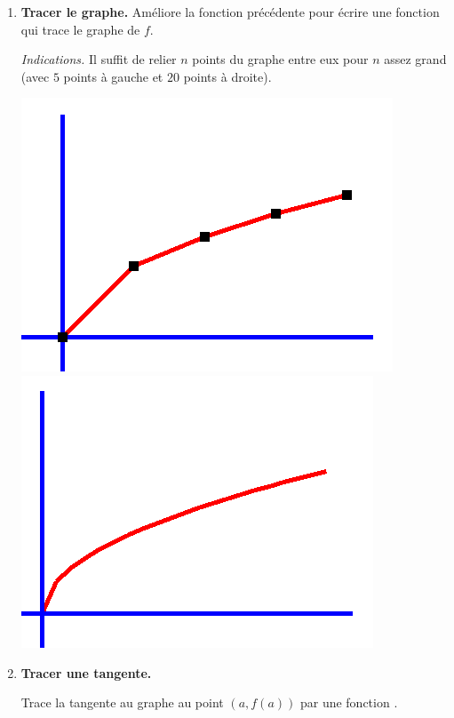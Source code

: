 \documentclass[11pt,class=report,crop=false]{standalone}
\begin{document}
\begin{activite}
\begin{enumerate}
  \item \textbf{Tracer le graphe.}
  Améliore la fonction précédente pour écrire  une fonction  qui trace le graphe de $f$.
  
  \emph{Indications.} Il suffit de relier $n$ points du graphe entre eux pour $n$ assez grand (avec $5$ points à gauche et $20$ points à droite).
  
\begin{center}
\includegraphics[scale=0.3]{ecran-graphe-2} \qquad
\includegraphics[scale=0.3]{ecran-graphe-3}
\end{center}

  
  \item \textbf{Tracer une tangente.}
  
  Trace la tangente au graphe au point $(a,f(a))$ par une fonction .
  

\end{enumerate}
\end{activite}
\end{document}
